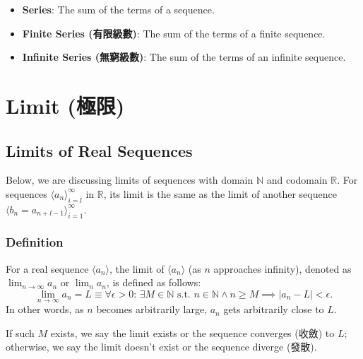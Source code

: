 \documentclass[a4paper,12pt]{report}
\begin{document}
\begin{itemize}
\item\textbf{Series}: The sum of the terms of a sequence.
\item\textbf{Finite Series (有限級數)}: The sum of the terms of a finite sequence.
\item\textbf{Infinite Series (無窮級數)}: The sum of the terms of an infinite sequence.
\end{itemize}



\section{Limit (極限)}
\subsection{Limits of Real Sequences}
Below, we are discussing limits of sequences with domain $\mathbb{N}$ and codomain $\mathbb{R}$. For sequences $\langle a_n\rangle_{i=l}^\infty$ in $\mathbb{R}$, its limit is the same as the limit of another sequence $\langle b_n=a_{n+l-1}\rangle_{i=1}^\infty$.
\subsubsection{Definition}
For a real sequence \(\langle a_n\rangle\), the limit of \(\langle a_n\rangle\) (as $n$ approaches infinity), denoted as $\lim_{n \to \infty} a_n$ or $\lim_n a_n$, is defined as follows:
\[\lim_{n \to \infty} a_n = L \equiv \forall \epsilon > 0:\, \exists M \in\mathbb{N}\text{\ s.t.\ } n\in\mathbb{N}\land n \geq M\implies |a_n - L| < \epsilon.\]
In other words, as \(n\) becomes arbitrarily large, \(a_n\) gets arbitrarily close to \(L\).

If such $M$ exists, we say the limit exists or the sequence converges (收斂) to $L$; otherwise, we say the limit doesn't exist or the sequence diverge (發散).
\end{document}
